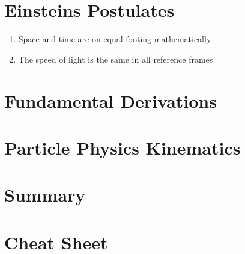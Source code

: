 
\section{Einsteins Postulates}
\begin{enumerate}
    \item Space and time are on equal footing mathematically
    \item The speed of light is the same in all reference frames
\end{enumerate}

\section{Fundamental Derivations}
\section{Particle Physics Kinematics}
\section{Summary}
\section{Cheat Sheet}

